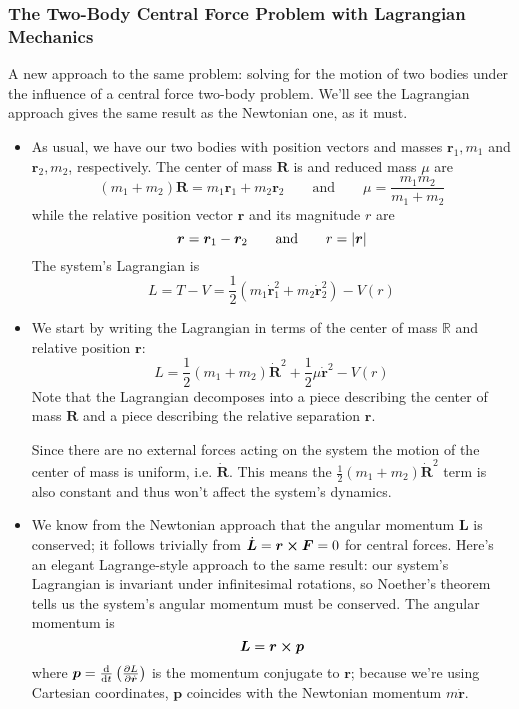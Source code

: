 \documentclass[11pt, a4paper]{article}
\newcommand{\eqtext}[1]{\qquad \text{#1} \qquad}
\newcommand{\R}{\mathbb{R}} %
\newcommand{\bdot}[1]{\dot{\bm{#1}}} %
\begin{document}
\subsubsection{The Two-Body Central Force Problem with Lagrangian Mechanics}
A new approach to the same problem: solving for the motion of two bodies under the influence of a central force two-body problem. We'll see the Lagrangian approach gives the same result as the Newtonian one, as it must.
\begin{itemize}
	\item As usual, we have our two bodies with position vectors and masses $ \bm{r}_{1}, m_{1} $  and $ \bm{r}_{2}, m_{2}$, respectively. The center of mass $ \bm{R} $ is and reduced mass $ \mu $ are
	\begin{equation*}
		(m_{1} + m_{2}) \bm{R} = m_{1}\bm{r}_{1} + m_{2}\bm{r}_{2} \eqtext{and} \mu = \frac{m_{1}m_{2}}{m_{1} + m_{2}}
	\end{equation*}
	while the relative position vector $ \bm{r} $ and its magnitude $ r $ are
	\begin{equation*}
		\bm{r} = \bm{r}_{1} - \bm{r}_{2}  \eqtext{and} r = \abs{\bm{r}}
	\end{equation*}
	The system's Lagrangian is
	\begin{equation*}
		L = T - V = \frac{1}{2}\left(m_{1}\bdot{r}_{1}^{2} + m_{2}\bdot{r}_{2}^{2}\right) - V(r)
	\end{equation*}

	\item We start by writing the Lagrangian in terms of the center of mass $ \R $ and relative position $ \bm{r} $:
	\begin{equation*}
		L = \frac{1}{2}(m_{1} + m_{2}) \bdot{R}^{2} + \frac{1}{2}\mu \bdot{r}^{2} - V(r)
	\end{equation*}
	Note that the Lagrangian decomposes into a piece describing the center of mass $ \bm{R} $  and a piece describing the relative separation $ \bm{r} $. 
	
	Since there are no external forces acting on the system the motion of the center of mass is uniform, i.e. $ \bdot{R} $. This means the $ \frac{1}{2}(m_{1} + m_{2}) \bdot{R}^{2} $ term is also constant and thus won't affect the system's dynamics. 
	
	\item We know from the Newtonian approach that the angular momentum $ \bm{L} $ is conserved; it follows trivially from $ \bdot{L} = \bm{r} \cross \bm{F} = 0 $ for central forces. Here's an elegant Lagrange-style approach to the same result: our system's Lagrangian is invariant under infinitesimal rotations, so Noether's theorem tells us the system's angular momentum must be conserved. The angular momentum is 
	\begin{equation*}
		\bm{L} = \bm{r} \cross \bm{p} 
	\end{equation*}
	where $ \bm{p} = \dv{}{t}\left(\pdv{L}{\bdot{r}}\right) $ is the momentum conjugate to $ \bm{r} $; because we're using Cartesian coordinates, $ \bm{p} $ coincides with the Newtonian momentum $ m \bdot{r} $.
	

\end{itemize}
\end{document}
